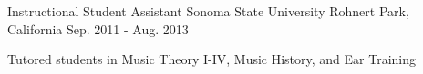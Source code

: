 \documentclass[../omelveny-cv]{subfiles}
\begin{document}
\begin{cventries}
    \cventry
    {Instructional Student Assistant}
    {Sonoma State University}
    {Rohnert Park, California}
    {Sep. 2011 - Aug. 2013}
    {
        \begin{cvitems}
            \item {Tutored students in Music Theory I-IV, Music History, and Ear Training}
        \end{cvitems}
    }

\end{cventries}
\end{document}
